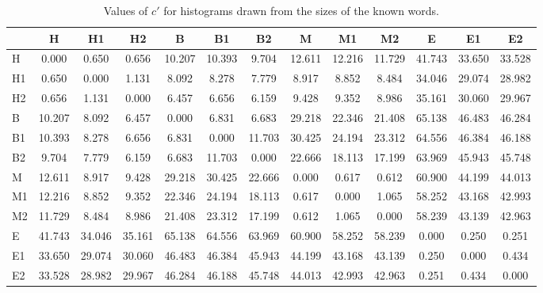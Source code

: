 \begin{table*}[h!]
\begin{center}
\begin{tabular}{| l | c | c | c | c | c | c | c | c | c | c | c | c |}\hline
 & H & H1 & H2 & B & B1 & B2 & M & M1 & M2 & E & E1 & E2 \\\hline
H & 0.000  & 0.650  & 0.656  & 10.207  & 10.393  & 9.704  & 12.611  & 12.216  & 11.729  & 41.743  & 33.650  & 33.528 \\\hline
H1 & 0.650  & 0.000  & 1.131  & 8.092  & 8.278  & 7.779  & 8.917  & 8.852  & 8.484  & 34.046  & 29.074  & 28.982 \\\hline
H2 & 0.656  & 1.131  & 0.000  & 6.457  & 6.656  & 6.159  & 9.428  & 9.352  & 8.986  & 35.161  & 30.060  & 29.967 \\\hline
B & 10.207  & 8.092  & 6.457  & 0.000  & 6.831  & 6.683  & 29.218  & 22.346  & 21.408  & 65.138  & 46.483  & 46.284 \\\hline
B1 & 10.393  & 8.278  & 6.656  & 6.831  & 0.000  & 11.703  & 30.425  & 24.194  & 23.312  & 64.556  & 46.384  & 46.188 \\\hline
B2 & 9.704  & 7.779  & 6.159  & 6.683  & 11.703  & 0.000  & 22.666  & 18.113  & 17.199  & 63.969  & 45.943  & 45.748 \\\hline
M & 12.611  & 8.917  & 9.428  & 29.218  & 30.425  & 22.666  & 0.000  & 0.617  & 0.612  & 60.900  & 44.199  & 44.013 \\\hline
M1 & 12.216  & 8.852  & 9.352  & 22.346  & 24.194  & 18.113  & 0.617  & 0.000  & 1.065  & 58.252  & 43.168  & 42.993 \\\hline
M2 & 11.729  & 8.484  & 8.986  & 21.408  & 23.312  & 17.199  & 0.612  & 1.065  & 0.000  & 58.239  & 43.139  & 42.963 \\\hline
E & 41.743  & 34.046  & 35.161  & 65.138  & 64.556  & 63.969  & 60.900  & 58.252  & 58.239  & 0.000  & 0.250  & 0.251 \\\hline
E1 & 33.650  & 29.074  & 30.060  & 46.483  & 46.384  & 45.943  & 44.199  & 43.168  & 43.139  & 0.250  & 0.000  & 0.434 \\\hline
E2 & 33.528  & 28.982  & 29.967  & 46.284  & 46.188  & 45.748  & 44.013  & 42.993  & 42.963  & 0.251  & 0.434  & 0.000 \\\hline
\end{tabular}
\caption{Values of $c'$ for histograms drawn from the sizes of the known words.}
\end{center}
\end{table*}